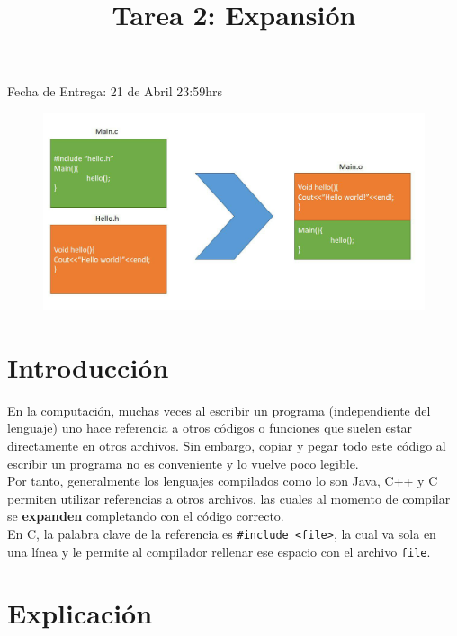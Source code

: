 \documentclass[dcc]{fcfmcourse}
\title{Tarea 2: Expansión}
\begin{document}
\maketitle
\vspace{-2ex}
\begin{center}
Fecha de Entrega: 21 de Abril 23:59hrs
\end{center}

\begin{figure}[h!]
    \centering
    \includegraphics[scale=0.8]{imagenes/diagrama.jpg}
\end{figure}

\section{Introducción}
En la computación, muchas veces al escribir un programa (independiente del lenguaje) uno hace referencia a otros códigos o funciones que suelen estar directamente en otros archivos. Sin embargo, copiar y pegar todo este código al escribir un programa no es conveniente y lo vuelve poco legible.\\

Por tanto, generalmente los lenguajes compilados como lo son Java, C++ y C permiten utilizar referencias a otros archivos, las cuales al momento de compilar se \textbf{expanden} completando con el código correcto. \\

En C, la palabra clave de la referencia es \texttt{\#include <file>}, la cual va sola en una línea y le permite al compilador rellenar ese espacio con el archivo \texttt{file}.

\section{Explicación}
\end{document}
